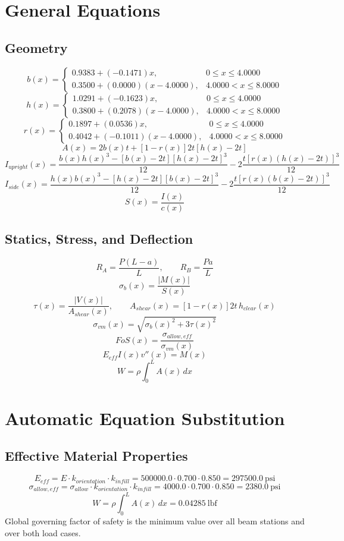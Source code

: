 \documentclass[11pt]{article}
\begin{document}
\section*{General Equations}
\subsection*{Geometry}
\[
b(x)=\begin{cases}0.9383 + (-0.1471)x, & 0 \le x \le 4.0000\\0.3500 + (0.0000)(x-4.0000), & 4.0000 < x \le 8.0000\end{cases}
\]
\[
h(x)=\begin{cases}1.0291 + (-0.1623)x, & 0 \le x \le 4.0000\\0.3800 + (0.2078)(x-4.0000), & 4.0000 < x \le 8.0000\end{cases}
\]
\[
r(x)=\begin{cases}0.1897 + (0.0536)x, & 0 \le x \le 4.0000\\0.4042 + (-0.1011)(x-4.0000), & 4.0000 < x \le 8.0000\end{cases}
\]
\[
A(x)=2b(x)t+[1-r(x)]2t[h(x)-2t]
\]
\[
I_{upright}(x)=\frac{b(x)h(x)^3-[b(x)-2t][h(x)-2t]^3}{12}-2\frac{t[r(x)(h(x)-2t)]^3}{12}
\]
\[
I_{side}(x)=\frac{h(x)b(x)^3-[h(x)-2t][b(x)-2t]^3}{12}-2\frac{t[r(x)(b(x)-2t)]^3}{12}
\]
\[
S(x)=\frac{I(x)}{c(x)}
\]

\subsection*{Statics, Stress, and Deflection}
\[
R_A=\frac{P(L-a)}{L}, \qquad R_B=\frac{Pa}{L}
\]
\[
\sigma_b(x)=\frac{|M(x)|}{S(x)}
\]
\[
\tau(x)=\frac{|V(x)|}{A_{shear}(x)}, \qquad A_{shear}(x)=[1-r(x)]2t\,h_{clear}(x)
\]
\[
\sigma_{vm}(x)=\sqrt{\sigma_b(x)^2+3\tau(x)^2}
\]
\[
FoS(x)=\frac{\sigma_{allow,eff}}{\sigma_{vm}(x)}
\]
\[
E_{eff}I(x)v''(x)=M(x)
\]
\[
W=\rho\int_0^L A(x)\,dx
\]

\section*{Automatic Equation Substitution}
\subsection*{Effective Material Properties}
\[E_{eff} = E \cdot k_{orientation} \cdot k_{infill} = 500000.0 \cdot 0.700 \cdot 0.850 = 297500.0\ \mathrm{psi}\]
\[\sigma_{allow,eff} = \sigma_{allow} \cdot k_{orientation} \cdot k_{infill} = 4000.0 \cdot 0.700 \cdot 0.850 = 2380.0\ \mathrm{psi}\]
\[W = \rho \int_0^L A(x)\,dx = 0.04285\ \mathrm{lbf}\]
Global governing factor of safety is the minimum value over all beam stations and over both load cases.
\end{document}
